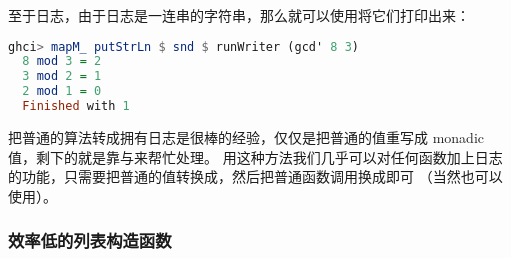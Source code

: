 \documentclass[./main.tex]{subfiles}
\begin{document}
至于日志，由于日志是一连串的字符串，那么就可以使用将它们打印出来：

\begin{lstlisting}[language=Haskell]
  ghci> mapM_ putStrLn $ snd $ runWriter (gcd' 8 3)
  8 mod 3 = 2
  3 mod 2 = 1
  2 mod 1 = 0
  Finished with 1
\end{lstlisting}

把普通的算法转成拥有日志是很棒的经验，仅仅是把普通的值重写成 monadic 值，剩下的就是靠\acode{>>=}与来帮忙处理。
用这种方法我们几乎可以对任何函数加上日志的功能，只需要把普通的值转换成，然后把普通函数调用换成\acode{>>=}即可
（当然也可以使用）。

\subsubsection*{效率低的列表构造函数}

\end{document}
